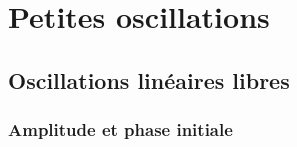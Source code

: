 \chapter{Petites oscillations}

\section{Oscillations lin\'eaires libres}

\subsection{Amplitude et phase initiale}